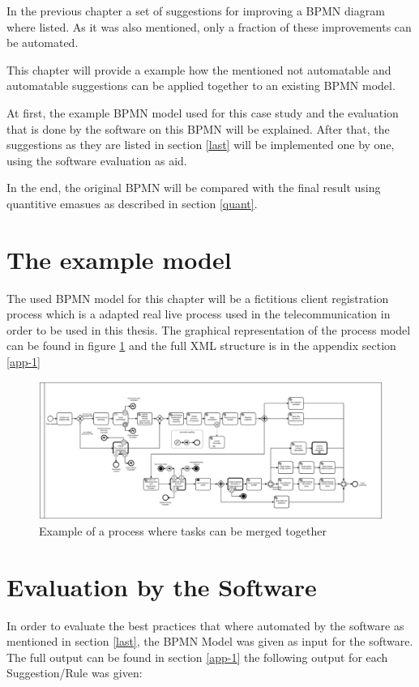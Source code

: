 \label{chapter-5}
In the previous chapter a set of suggestions for improving a BPMN diagram where listed. As it was also mentioned, only a fraction of these improvements can be automated. 

This chapter will provide a example how the mentioned not automatable and automatable suggestions can be applied together to an existing BPMN model. 

At first, the example BPMN model used for this case study and the evaluation that is done by the software on this BPMN will be explained. After that, the suggestions as they are listed in section \ref{last} will be implemented one by one, using the software evaluation as aid. 

In the end, the original BPMN will be compared with the final result using quantitive emasues as described in section \ref{quant}.

\section{The example model}
The used BPMN model for this chapter will be a fictitious client registration process which is a adapted real live process used in the telecommunication in order to be used in this thesis. The graphical representation of the process model can be found in figure \ref{fig:example-process} and the full XML structure is in the appendix section \ref{app-1}

\begin{figure}[H]
	\centering
	\includegraphics[width=1.7\columnwidth, angle=90 ]{graphics/process-bpmn.pdf}
	\caption{Example of a process where tasks can be merged together} 
	\label{fig:example-process} 
\end{figure}

\section{Evaluation by the Software}
In order to evaluate the best practices that where automated by the software as mentioned in section \ref{last}, the BPMN Model was given as input for the software. The full output can be found in section \ref{app-1} the following output for each Suggestion/Rule was given:
